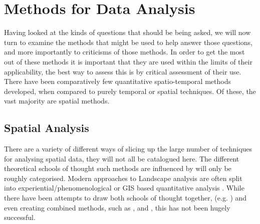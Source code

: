 \chapter{Methods for Data Analysis} %
\label{ch:analysis}
Having looked at the kinds of questions that should be being asked, we will now turn to examine the methods that might be used to help answer those questions, and more importantly  to criticisms of those methods. In order to get the most out of these methods it is important that they are used within the limits of their applicability, the best way to assess this is by critical assessment of their use. There have been comparatively few quantitative spatio-temporal methods developed, when compared to purely temporal or spatial techniques. Of these, the vast majority are spatial methods.

\section{Spatial Analysis}
There are a variety of different ways of slicing up the large number of techniques for analysing spatial data, they will not all be catalogued here. The different theoretical schools of thought such methods are influenced by will only be roughly categorised. Modern approaches to Landscape analysis are often split into experiential/phenomenological or GIS based quantitative analysis \citep[491]{GravesMcEwan2012}. While there have been attempts to draw both schools of thought together, (e.g. \citealp{Lake:2007fk}) and even creating combined methods, such as \citet{Rennell2012}, \citet{Eve2012} and \citet{Millican2012}, this has not been hugely successful. 

